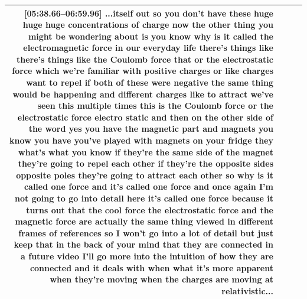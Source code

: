 \documentclass[10pt]{article}
\begin{document}
\begin{tiny}
\begin{longtable}{|r|p{0.375in}|p{1.275in}|p{3.5in}|}
                                                                                                                                                                                                                                                                                                                                                                                      \textbf{[05:38.66--06:59.96]} ...itself out so you don't have these huge huge huge concentrations of charge now the other thing you might be wondering about is you know why is it called the electromagnetic force in our everyday life there's things like there's things like the Coulomb force that or the electrostatic force which we're familiar with positive charges or like charges want to repel if both of these were negative the same thing would be happening and different charges like to attract we've seen this multiple times this is the Coulomb force or the electrostatic force electro static and then on the other side of the word yes you have the magnetic part and magnets you know you have you've played with magnets on your fridge they what's what you know if they're the same side of the magnet they're going to repel each other if they're the opposite sides opposite poles they're going to attract each other so why is it called one force and it's called one force and once again I'm not going to go into detail here it's called one force because it turns out that the cool force the electrostatic force and the magnetic force are actually the same thing viewed in different frames of references so I won't go into a lot of detail but just keep that in the back of your mind that they are connected in a future video I'll go more into the intuition of how they are connected and it deals with when what it's more apparent when they're moving when the charges are moving at relativistic... \\\hline

\end{longtable}
\end{tiny}
\end{document}
